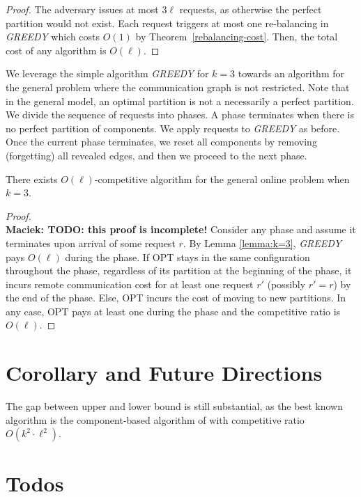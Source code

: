 \documentclass[manuscript,screen=true]{acmart}
\newcommand\maciek[1]{\color{brown}\textbf{\\ Maciek: #1}\color{black}}
\begin{document}
\begin{proof}
	The adversary issues at most $3\ell$ requests, as otherwise the perfect partition would not exist.
	Each request triggers at most one re-balancing in \emph{GREEDY}
	which costs $O(1)$ by Theorem~\ref{rebalancing-cost}.
	Then,
	the total cost of any algorithm is $O(\ell)$.
\end{proof}

We leverage the simple algorithm \emph{GREEDY} for $k=3$
towards an algorithm for the general problem
where the communication graph is not restricted.
Note that in the general model,
an optimal partition is not a necessarily a perfect partition.
We divide the sequence of requests into phases.
A phase terminates when there is no perfect partition of components.
We apply requests to \emph{GREEDY} as before. 
Once the current phase terminates,
we reset all components by removing (forgetting) all revealed edges,
and then we proceed to the next phase.

\begin{theorem} \label{cor:k=3}
	There exists $O(\ell)$-competitive algorithm for the general online problem when $k=3$. 
\end{theorem}
\begin{proof}
  \maciek{TODO: this proof is incomplete!}
	Consider any phase and assume it terminates upon arrival of some request $r$.
	By Lemma  \ref{lemma:k=3},
	\emph{GREEDY} pays $O(\ell)$ during the phase.
	If OPT stays in the same configuration throughout the phase,
	regardless of its partition at the beginning of the phase,        
	it incurs remote communication cost for at least one request $r'$ (possibly $r'=r$) by the end of the phase.
	Else,
	OPT incurs the cost of moving to new partitions.
	In any case,
	OPT pays at least one during the phase and 
	the competitive ratio is $O(\ell)$.
\end{proof}


\section{Corollary and Future Directions}

The gap between upper and lower bound is still substantial, as the best known algorithm is the component-based algorithm of   \cite{repartition-disc} with competitive ratio $O(k^2\cdot\ell^2)$.


\section{Todos}
\end{document}
